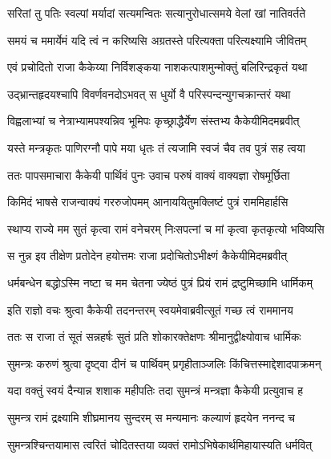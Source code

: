 \twolineshloka
{सरितां तु पतिः स्वल्पां मर्यादां सत्यमन्वितः}
{सत्यानुरोधात्समये वेलां खां नातिवर्तते} %

\twolineshloka
{समयं च ममार्येमं यदि त्वं न करिष्यसि}
{अग्रतस्ते परित्यक्ता परित्यक्ष्यामि जीवितम्} %

\twolineshloka
{एवं प्रचोदितो राजा कैकेय्या निर्विशङ्कया}
{नाशकत्पाशमुन्मोक्तुं बलिरिन्द्रकृतं यथा} %

\twolineshloka
{उद्भ्रान्तहृदयश्चापि विवर्णवनदोऽभवत्}
{स धुर्यो वै परिस्पन्दन्युगचक्रान्तरं यथा} %

\twolineshloka
{विह्वलाभ्यां च नेत्राभ्यामपश्यन्निव भूमिपः}
{कृच्छ्राद्धैर्येण संस्तभ्य कैकेयीमिदमब्रवीत्} %

\twolineshloka
{यस्ते मन्त्रकृतः पाणिरग्नौ पापे मया धृतः}
{तं त्यजामि स्वजं चैव तव पुत्रं सह त्वया} %

\twolineshloka
{ततः पापसमाचारा कैकेयी पार्थिवं पुनः}
{उवाच परुषं वाक्यं वाक्यज्ञा रोषमूर्छिता} %

\twolineshloka
{किमिदं भाषसे राजन्वाक्यं गररुजोपमम्}
{आनाययितुमक्लिष्टं पुत्रं राममिहार्हसि} %

\twolineshloka
{स्थाप्य राज्ये मम सुतं कृत्वा रामं वनेचरम्}
{निःसपत्नां च मां कृत्वा कृतकृत्यो भविष्यसि} %

\twolineshloka
{स नुन्न इव तीक्षेण प्रतोदेन हयोत्तमः}
{राजा प्रदोचितोऽभीक्ष्णं कैकेयीमिदमब्रवीत्} %

\twolineshloka
{धर्मबन्धेन बद्धोऽस्मि नष्टा च मम चेतना}
{ज्येष्ठं पुत्रं प्रियं रामं द्रष्टुमिच्छामि धार्मिकम्} %

\twolineshloka
{इति राज्ञो वचः श्रुत्वा कैकेयी तदनन्तरम्}
{स्वयमेवाब्रवीत्सूतं गच्छ त्वं राममानय} %

\twolineshloka
{ततः स राजा तं सूतं सन्नहर्षः सुतं प्रति}
{शोकारक्तेक्षणः श्रीमानुद्वीक्ष्योवाच धार्मिकः} %

\twolineshloka
{सुमन्त्रः करुणं श्रुत्वा दृष्ट्वा दीनं च पार्थिवम्}
{प्रगृहीताञ्जलिः किंचित्तस्माद्देशादपाक्रमन्} %

\twolineshloka
{यदा वक्तुं स्वयं दैन्यान्न शशाक महीपतिः}
{तदा सुमन्त्रं मन्त्रज्ञा कैकेयी प्रत्युवाच ह} %

\twolineshloka
{सुमन्त्र रामं द्रक्ष्यामि शीघ्रमानय सुन्दरम्}
{स मन्यमानः कल्याणं हृदयेन ननन्द च} %

\twolineshloka
{सुमन्त्रश्चिन्तयामास त्वरितं चोदितस्तया}
{व्यक्तं रामोऽभिषेकार्थमिहायास्यति धर्मवित्} %


